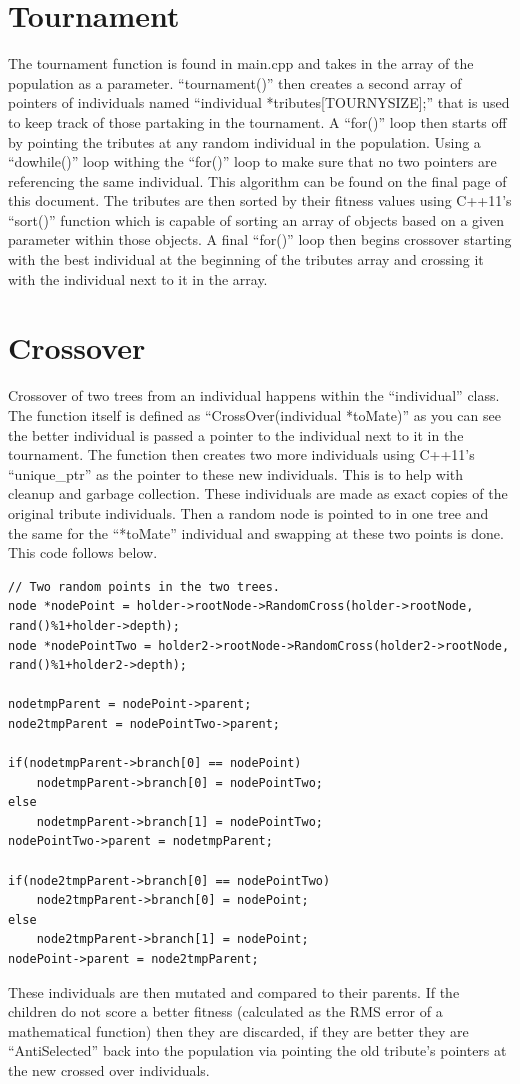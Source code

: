 \documentclass[twocolumn]{article}
\begin{document}
\section{Tournament}
The tournament function is found in main.cpp and takes in the array of the population as a parameter. ``tournament()'' then creates a second array of pointers of individuals named ``individual *tributes[TOURNYSIZE];'' that is used to keep track of those partaking in the tournament. A ``for()'' loop then starts off by pointing the tributes at any random individual in the population. Using a ``do{}while()'' loop withing the ``for()'' loop to make sure that no two pointers are referencing the same individual. This algorithm can be found on the final page of this document. The tributes are then sorted by their fitness values using C++11's ``sort()'' function which is capable of sorting an array of objects based on a given parameter within those objects. A final ``for()'' loop then begins crossover starting with the best individual at the beginning of the tributes array and crossing it with the individual next to it in the array.

\section{Crossover}
Crossover of two trees from an individual happens within the ``individual'' class. The function itself is defined as ``CrossOver(individual *toMate){}'' as you can see the better individual is passed a pointer to the individual next to it in the tournament. The function then creates two more individuals using C++11's ``unique\_ptr'' as the pointer to these new individuals. This is to help with cleanup and garbage collection. These individuals are made as exact copies of the original tribute individuals. Then a random node is pointed to in one tree and the same for the ``*toMate'' individual and swapping at these two points is done. This code follows below.
\begin{lstlisting}[frame=single]
// Two random points in the two trees.
node *nodePoint = holder->rootNode->RandomCross(holder->rootNode, rand()%1+holder->depth);
node *nodePointTwo = holder2->rootNode->RandomCross(holder2->rootNode, rand()%1+holder2->depth);

nodetmpParent = nodePoint->parent;
node2tmpParent = nodePointTwo->parent;

if(nodetmpParent->branch[0] == nodePoint)
	nodetmpParent->branch[0] = nodePointTwo;
else
	nodetmpParent->branch[1] = nodePointTwo;
nodePointTwo->parent = nodetmpParent;

if(node2tmpParent->branch[0] == nodePointTwo)
	node2tmpParent->branch[0] = nodePoint;
else
	node2tmpParent->branch[1] = nodePoint;
nodePoint->parent = node2tmpParent;
\end{lstlisting}
These individuals are then mutated and compared to their parents. If the children do not score a better fitness (calculated as the RMS error of a mathematical function) then they are discarded, if they are better they are ``AntiSelected'' back into the population via pointing the old tribute's pointers at the new crossed over individuals.
\end{document}
